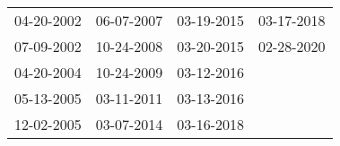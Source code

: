 \begin{supertabular}{llll}
 04-20-2002 &  06-07-2007 &  03-19-2015 &  03-17-2018 \\
 07-09-2002 &  10-24-2008 &  03-20-2015 &  02-28-2020 \\
 04-20-2004 &  10-24-2009 &  03-12-2016 &             \\
 05-13-2005 &  03-11-2011 &  03-13-2016 &             \\
 12-02-2005 &  03-07-2014 &  03-16-2018 &             \\
\end{supertabular}
